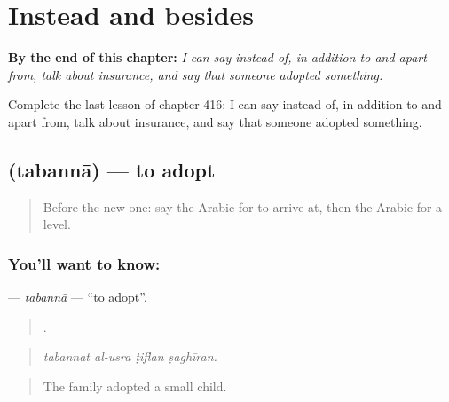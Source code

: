 
\chapter{Instead and besides}
\label{ch:ar-instead-and-besides}

\begin{chapteropening}
\textbf{By the end of this chapter:} \emph{I can say instead of, in addition to and apart from, talk about insurance, and say that someone adopted something.}

Complete the last lesson of chapter 416: I can say instead of, in addition to and apart from, talk about insurance, and say that someone adopted something.
\end{chapteropening}

\section[\texorpdfstring{\ar{تبنى} (tabannā)}{تبنى (tabannā)}]{ (tabannā) — to adopt}

\label{lesson:AR-C416-tabanna}



\begin{quote}
Before the new one: say the Arabic for to arrive at, then the Arabic for a level.
\end{quote}

\subsection*{You'll want to know: }
\textbf{} — \emph{tabannā} — \textquotedblleft{}to adopt\textquotedblright{}.

\begin{quote}
   .
\end{quote}

\begin{quote}
\emph{tabannat al-usra ṭiflan ṣaghīran.}
\end{quote}

\begin{quote}
The family adopted a small child.
\end{quote}

